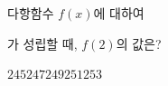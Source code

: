 다항함수 $f(x)$에 대하여 \par\smallskip{}\par\smallskip\noindent 가 성립할 때, $f(2)$의 값은? 
\begin{choices32}{$245$}{$247$}{$249$}{$251$}{$253$}\end{choices32}

